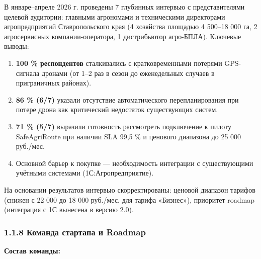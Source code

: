 В январе--апреле 2026 г. проведены 7 глубинных интервью с представителями целевой аудитории: главными агрономами и техническими директорами агропредприятий Ставропольского края (4 хозяйства площадью 4 500--18 000 га, 2 агросервисных компании-оператора, 1 дистрибьютор агро-БПЛА). Ключевые выводы:

\begin{enumerate}
\def\labelenumi{\arabic{enumi}.}
\tightlist
\item
  \textbf{100 \% респондентов} сталкивались с кратковременными потерями GPS-сигнала дронами (от 1--2 раз в сезон до еженедельных случаев в приграничных районах).
\item
  \textbf{86 \% (6/7)} указали отсутствие автоматического перепланирования при потере дрона как критический недостаток существующих систем.
\item
  \textbf{71 \% (5/7)} выразили готовность рассмотреть подключение к пилоту SafeAgriRoute при наличии SLA 99,5 \% и ценового диапазона до 25 000 руб./мес.
\item
  Основной барьер к покупке --- необходимость интеграции с существующими учётными системами (1С:Агропредприятие).
\end{enumerate}

На основании результатов интервью скорректированы: ценовой диапазон тарифов (снижен с 22 000 до 18 000 руб./мес. для тарифа «Бизнес»), приоритет roadmap (интеграция с 1С вынесена в версию 2.0).

\hypertarget{ux43aux43eux43cux430ux43dux434ux430-ux441ux442ux430ux440ux442ux430ux43fux430-ux438-roadmap}{%
\subsubsection{1.1.8 Команда стартапа и Roadmap}\label{ux43aux43eux43cux430ux43dux434ux430-ux441ux442ux430ux440ux442ux430ux43fux430-ux438-roadmap}}

\textbf{Состав команды:}

